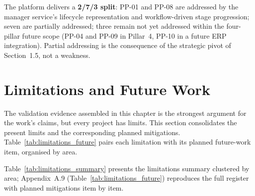 The platform delivers a \textbf{2/7/3 split}: PP-01 and PP-08 are addressed by the manager service's lifecycle representation and workflow-driven stage progression; seven are partially addressed; three remain not yet addressed within the four-pillar future scope (PP-04 and PP-09 in Pillar~4, PP-10 in a future ERP integration). Partial addressing is the consequence of the strategic pivot of Section~1.5, not a weakness.

\section{Limitations and Future Work}
The validation evidence assembled in this chapter is the strongest argument for the work's claims, but every project has limits. This section consolidates the present limits and the corresponding planned mitigations. Table~\ref{tab:limitations_future} pairs each limitation with its planned future-work item, organised by area.

Table~\ref{tab:limitations_summary} presents the limitations summary clustered by area; Appendix~A.9 (Table~\ref{tab:limitations_future}) reproduces the full register with planned mitigations item by item.

